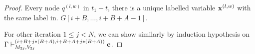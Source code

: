 \documentclass[a4paper,11pt]{article}
\begin{document}
\begin{proof}
 Every node $q^{(l,w)}$ in $t_1-t$, there is a unique labelled variable $\mathbf{{x}}^{(l,w)}$ with the same label in. $G[i+B,\ldots,i+B+A-1]$. 
 
 For other iteration $ 1 \leq j < N$, we can show similarly by induction hypothesis
 on ${\Gamma \vdash^{(i+B+j*(B+A),i+B+A+j*(B+A) )}_{M_{2j}, V_{2j}} \mathbf{{c}} 
}$. 
\end{proof}
%
 
 
 
 
\end{document}
